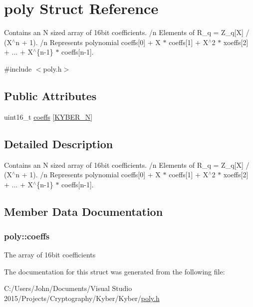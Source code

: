 \hypertarget{structpoly}{}\section{poly Struct Reference}
\label{structpoly}


Contains an N sized array of 16bit coefficients. /n Elements of R\+\_\+q = Z\+\_\+q\mbox{[}X\mbox{]} / (X$^\wedge$n + 1). /n Represents polynomial coeffs\mbox{[}0\mbox{]} + X $\ast$ coeffs\mbox{[}1\mbox{]} + X$^\wedge$2 $\ast$ xoeffs\mbox{[}2\mbox{]} + ... + X$^\wedge$\{n-\/1\} $\ast$ coeffs\mbox{[}n-\/1\mbox{]}.  




{\ttfamily \#include $<$poly.\+h$>$}

\subsection*{Public Attributes}
\begin{DoxyCompactItemize}
\item 
uint16\+\_\+t \hyperlink{structpoly_ae33e4ba4cd04dd333bcfc4ec89a3b842}{coeffs} \mbox{[}\hyperlink{params_8h_add4f22a10cc799b6846a517183c7f4cb}{K\+Y\+B\+E\+R\+\_\+\+N}\mbox{]}
\end{DoxyCompactItemize}


\subsection{Detailed Description}
Contains an N sized array of 16bit coefficients. /n Elements of R\+\_\+q = Z\+\_\+q\mbox{[}X\mbox{]} / (X$^\wedge$n + 1). /n Represents polynomial coeffs\mbox{[}0\mbox{]} + X $\ast$ coeffs\mbox{[}1\mbox{]} + X$^\wedge$2 $\ast$ xoeffs\mbox{[}2\mbox{]} + ... + X$^\wedge$\{n-\/1\} $\ast$ coeffs\mbox{[}n-\/1\mbox{]}. 

\subsection{Member Data Documentation}
\hypertarget{structpoly_ae33e4ba4cd04dd333bcfc4ec89a3b842}{}
\subsubsection[{coeffs}]{\setlength{\rightskip}{0pt plus 5cm}poly\+::coeffs}\label{structpoly_ae33e4ba4cd04dd333bcfc4ec89a3b842}
The array of 16bit coefficients 

The documentation for this struct was generated from the following file\+:\begin{DoxyCompactItemize}
\item 
C\+:/\+Users/\+John/\+Documents/\+Visual Studio 2015/\+Projects/\+Cryptography/\+Kyber/\+Kyber/\hyperlink{poly_8h}{poly.\+h}\end{DoxyCompactItemize}
